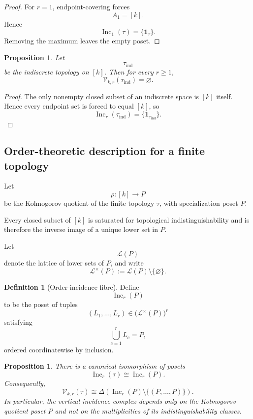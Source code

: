 \documentclass[11pt]{article}
\theoremstyle{plain}
\newtheorem{proposition}[theorem]{Proposition}
\theoremstyle{definition}
\newtheorem{definition}[theorem]{Definition}
\begin{document}
\begin{proof}
For $r=1$, endpoint-covering forces
\[
A_1=[k].
\]
Hence
\[
\operatorname{Inc}_1(\tau)
=
\{\mathbf1_\tau\}.
\]
Removing the maximum leaves the empty poset.
\end{proof}

\begin{proposition}
\label{prop:vertical-indiscrete-empty}
Let
\[
\tau_{\mathrm{ind}}
\]
be the indiscrete topology on $[k]$.  Then for every $r\geq1$,
\[
\mathcal V_{k,r}(\tau_{\mathrm{ind}})
=
\varnothing.
\]
\end{proposition}

\begin{proof}
The only nonempty closed subset of an indiscrete space is $[k]$ itself.
Hence every endpoint set is forced to equal $[k]$, so
\[
\operatorname{Inc}_r(\tau_{\mathrm{ind}})
=
\{\mathbf1_{\tau_{\mathrm{ind}}}\}.
\]
\end{proof}

\subsection{Order-theoretic description for a finite topology}
\label{subsec:vertical-order-description}

Let
\[
\rho:[k]\longrightarrow P
\]
be the Kolmogorov quotient of the finite topology $\tau$, with
specialization poset $P$.

Every closed subset of $[k]$ is saturated for topological
indistinguishability and is therefore the inverse image of a unique
lower set in $P$.

Let
\[
\mathcal L(P)
\]
denote the lattice of lower sets of $P$, and write
\[
\mathcal L^\times(P)
:=
\mathcal L(P)\setminus\{\varnothing\}.
\]

\begin{definition}[Order-incidence fibre]
\label{def:order-incidence-fibre}
Define
\[
\operatorname{Inc}_r(P)
\]
to be the poset of tuples
\[
(L_1,\ldots,L_r)
\in
\bigl(\mathcal L^\times(P)\bigr)^r
\]
satisfying
\[
\bigcup_{c=1}^rL_c=P,
\]
ordered coordinatewise by inclusion.
\end{definition}

\begin{proposition}
\label{prop:vertical-depends-T0}
There is a canonical isomorphism of posets
\[
\operatorname{Inc}_r(\tau)
\cong
\operatorname{Inc}_r(P).
\]
Consequently,
\[
\mathcal V_{k,r}(\tau)
\cong
\Delta
\left(
\operatorname{Inc}_r(P)
\setminus\{(P,\ldots,P)\}
\right).
\]
In particular, the vertical incidence complex depends only on the
Kolmogorov quotient poset $P$ and not on the multiplicities of its
indistinguishability classes.
\end{proposition}
\end{document}
